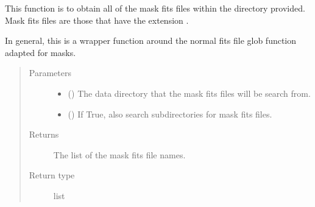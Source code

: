 \documentclass[letterpaper,10pt,english]{sphinxmanual}
\begin{document}
\begin{fulllineitems}
\label{\detokenize{docstrings/ifa_smeargle.masking.base_functions:ifa_smeargle.masking.base_functions.get_mask_fits_filenames}}
This function is to obtain all of the mask fits files within
the directory provided. Mask fits files are those that have the
extension .

In general, this is a wrapper function around the normal
fits file glob function adapted for masks.
\begin{quote}\begin{description}
\item[{Parameters}] \leavevmode\begin{itemize}
\item {} 
 () \textendash{} The data directory that the mask fits files will be search
from.

\item {} 
 (\sphinxstyleliteralemphasis{\sphinxupquote{ (}}\sphinxstyleliteralemphasis{\sphinxupquote{)}}) \textendash{} If True, also search subdirectories for mask fits files.

\end{itemize}

\item[{Returns}] \leavevmode
{} \textendash{} The list of the mask fits file names.

\item[{Return type}] \leavevmode
list

\end{description}\end{quote}

\end{fulllineitems}

\end{document}
